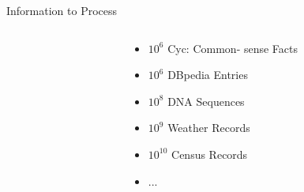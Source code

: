 \documentclass[12pt,landscape,english]{beamer}
\begin{document}
\begin{frame} {Information to Process}
\begin{columns}[T]
\begin{column}{0.5\textwidth}
\begin{itemize}
		\end{itemize}		
	\end{column}
		\begin{column}{0.5\textwidth}
			\centering{}
			\begin{itemize}
				\item $10^6$ {\small  Cyc: Common- sense Facts}
				\item $10^6$ DBpedia Entries
				\item $10^8$ DNA Sequences 
				\item $10^9$ Weather Records
				\item $10^{10}$ Census Records
				\item ...
			\end{itemize}		
		\end{column}
\end{columns}
\end{frame}
\end{document}
